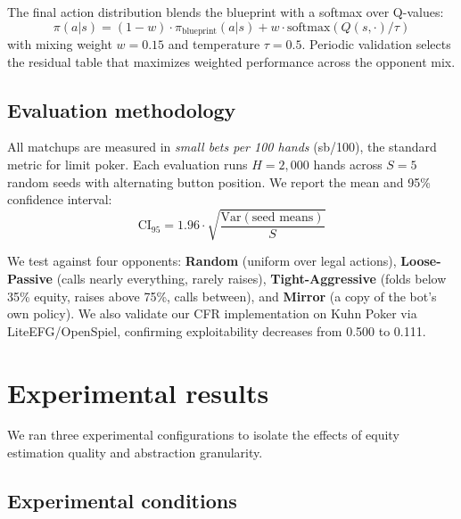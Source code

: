 \documentclass{article}
\begin{document}
The final action distribution blends the blueprint with a softmax over Q-values:
\begin{equation}
    \pi(a|s) = (1 - w) \cdot \pi_{\text{blueprint}}(a|s) + w \cdot \text{softmax}(Q(s, \cdot) / \tau)
\end{equation}
with mixing weight $w = 0.15$ and temperature $\tau = 0.5$. Periodic validation selects the residual table that maximizes weighted performance across the opponent mix.

\subsection{Evaluation methodology}

All matchups are measured in \textit{small bets per 100 hands} (sb/100), the standard metric for limit poker. Each evaluation runs $H = 2{,}000$ hands across $S = 5$ random seeds with alternating button position. We report the mean and 95\% confidence interval:
\begin{equation}
    \text{CI}_{95} = 1.96 \cdot \sqrt{\frac{\text{Var}(\text{seed means})}{S}}
\end{equation}

We test against four opponents: \textbf{Random} (uniform over legal actions), \textbf{Loose-Passive} (calls nearly everything, rarely raises), \textbf{Tight-Aggressive} (folds below 35\% equity, raises above 75\%, calls between), and \textbf{Mirror} (a copy of the bot's own policy). We also validate our CFR implementation on Kuhn Poker via LiteEFG/OpenSpiel, confirming exploitability decreases from 0.500 to 0.111.

\section{Experimental results}

We ran three experimental configurations to isolate the effects of equity estimation quality and abstraction granularity.

\subsection{Experimental conditions}
\end{document}
